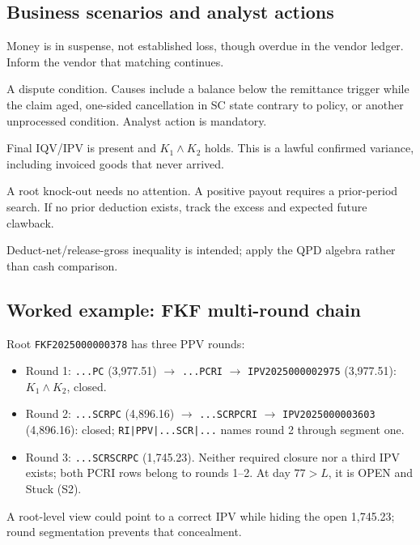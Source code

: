 \documentclass[11pt,a4paper]{article}
\theoremstyle{definition}
\begin{document}
\subsection{Business scenarios and analyst actions}
\begin{description}[leftmargin=1.5em,style=nextline]
\item[S1---Open inside window.] Money is in suspense, not established
loss, though overdue in the vendor ledger. Inform the vendor that
matching continues.
\item[S2---Open beyond window.] A dispute condition. Causes include a
balance below the remittance trigger while the claim aged, one-sided
cancellation in SC state contrary to policy, or another unprocessed
condition. Analyst action is mandatory.
\item[S3---Converted.] Final IQV/IPV is present and $K_1\wedge K_2$
holds. This is a lawful confirmed variance, including invoiced goods
that never arrived.
\item[S4---Closure without in-file deduction.] A root knock-out needs no
attention. A positive payout requires a prior-period search. If no prior
deduction exists, track the excess and expected future clawback.
\item[S5---QPD-active.] Deduct-net/release-gross inequality is intended;
apply the QPD algebra rather than cash comparison.
\end{description}

\subsection{Worked example: FKF multi-round chain}
Root \texttt{FKF2025000000378} has three PPV rounds:
\begin{itemize}[leftmargin=1.5em]
\item Round 1: \texttt{...PC} (3,977.51) $\to$ \texttt{...PCRI}
$\to$ \texttt{IPV2025000002975} (3,977.51): $K_1\wedge K_2$, closed.
\item Round 2: \texttt{...SCRPC} (4,896.16) $\to$
\texttt{...SCRPCRI} $\to$ \texttt{IPV2025000003603} (4,896.16):
closed; \texttt{RI|PPV|...SCR|...} names round 2 through segment one.
\item Round 3: \texttt{...SCRSCRPC} (1,745.23). Neither required
closure nor a third IPV exists; both PCRI rows belong to rounds 1--2.
At day $77>L$, it is OPEN and Stuck (S2).
\end{itemize}
A root-level view could point to a correct IPV while hiding the open
1,745.23; round segmentation prevents that concealment.
\end{document}
